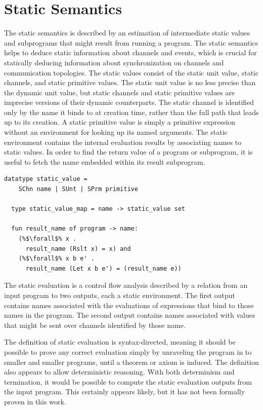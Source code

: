 \documentclass{article}
\begin{document}
\section{Static Semantics}
The static semantics is described by an estimation of intermediate static values and subprograms
that might result from running a program.    
The static semantics helps to deduce static information about channels and events, which is
crucial for statically deducing information about synchronization on channels and
communication topologies.
The static values consist of the static unit value, static channels, and static primitive
values. The static unit value is no less precise than the dynamic unit value, but
static channels and static primitive values are imprecise versions of their dynamic
counterparts. The static channel is identified only by the name it binds to at creation time,
rather than the full path that leads up to its creation.  A static primitive value is simply a
primitive expression without an environment for looking up its named arguments. The static
environment contains the internal evaluation results by associating names to static values.
In order to find the return value of a program or subprogram, it is useful to fetch the name
embedded within its result subprogram.

\begin{lstlisting}[language=logic, escapechar=\%]
  datatype static_value =
    SChn name | SUnt | SPrm primitive 

  type static_value_map = name -> static_value set

  fun result_name of program -> name:
    (%$\forall$% x .
      result_name (Rslt x) = x) and
    (%$\forall$% x b e' . 
      result_name (Let x b e') = (result_name e))
  \end{lstlisting}


The static evaluation is a control flow analysis described by a relation from an input program
to two outputs, each a static environment. The first output contains names associated with the
evaluations of expressions that bind to those names in the program. The second output contains
names associated with values that might be sent over channels identified by those name.

The definition of static evaluation is syntax-directed, meaning it should be possible to
prove any correct evaluation simply by unraveling the program in to smaller and smaller
programs, until a theorem or axiom is induced. The definition also appears to allow
deterministic reasoning. With both determinism and termination, it would be possible to compute
the static evaluation outputs from the input program. This certainly appears likely, but it has
not been formally proven in this work.
\end{document}
